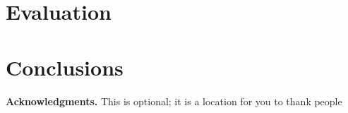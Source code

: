 \documentclass{mpaper}
\begin{document}




\section{Evaluation}





\section{Conclusions}


\vskip8pt \noindent
{\bf Acknowledgments.}
This is optional; it is a location for you to thank people



\end{document}
